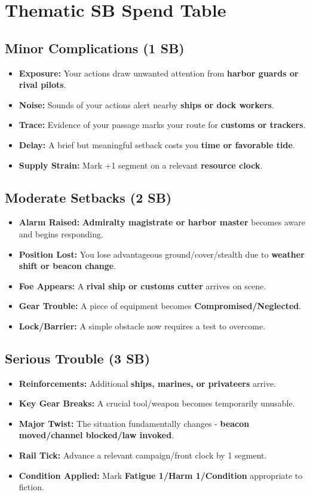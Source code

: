 \section*{Thematic SB Spend Table}
\label{sec:kahfagia-sb}

\subsection*{Minor Complications (1 SB)}
\begin{itemize}
\item \textbf{Exposure:} Your actions draw unwanted attention from \textbf{harbor guards or rival pilots}.
\item \textbf{Noise:} Sounds of your actions alert nearby \textbf{ships or dock workers}.
\item \textbf{Trace:} Evidence of your passage marks your route for \textbf{customs or trackers}.
\item \textbf{Delay:} A brief but meaningful setback costs you \textbf{time or favorable tide}.
\item \textbf{Supply Strain:} Mark +1 segment on a relevant \textbf{resource clock}.
\end{itemize}

\subsection*{Moderate Setbacks (2 SB)}
\begin{itemize}
\item \textbf{Alarm Raised:} \textbf{Admiralty magistrate or harbor master} becomes aware and begins responding.
\item \textbf{Position Lost:} You lose advantageous ground/cover/stealth due to \textbf{weather shift or beacon change}.
\item \textbf{Foe Appears:} A \textbf{rival ship or customs cutter} arrives on scene.
\item \textbf{Gear Trouble:} A piece of equipment becomes \textbf{Compromised/Neglected}.
\item \textbf{Lock/Barrier:} A simple obstacle now requires a test to overcome.
\end{itemize}

\subsection*{Serious Trouble (3 SB)}
\begin{itemize}
\item \textbf{Reinforcements:} Additional \textbf{ships, marines, or privateers} arrive.
\item \textbf{Key Gear Breaks:} A crucial tool/weapon becomes temporarily unusable.
\item \textbf{Major Twist:} The situation fundamentally changes - \textbf{beacon moved/channel blocked/law invoked}.
\item \textbf{Rail Tick:} Advance a relevant campaign/front clock by 1 segment.
\item \textbf{Condition Applied:} Mark \textbf{Fatigue 1/Harm 1/Condition} appropriate to fiction.
\end{itemize}


